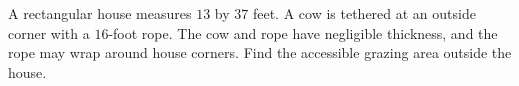 A rectangular house measures $13$ by $37$ feet. A cow is tethered at an outside corner with a $16$-foot rope. The cow and rope have negligible thickness, and the rope may wrap around house corners. Find the accessible grazing area outside the house.
